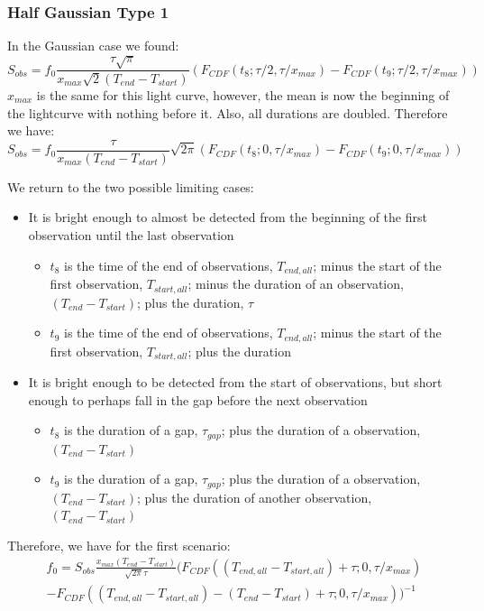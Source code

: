 \documentclass{article}
\begin{document}
\subsubsection{Half Gaussian Type 1}
In the Gaussian case we found:
\[S_{obs} = f_0  \frac{\tau\sqrt{\pi}}{x_{max}\sqrt{2}(T_{end}-T_{start})}(F_{CDF}(t_8; \tau/2,\tau/x_{max}) -F_{CDF}(t_9; \tau/2, \tau/x_{max}))\]
$x_{max}$ is the same for this light curve, however, the mean is now the beginning of the lightcurve with nothing before it. Also, all durations are doubled. Therefore we have:
\[S_{obs} = f_0 \frac{\tau}{x_{max}(T_{end} - T_{start})}\sqrt{2\pi}(F_{CDF}(t_8; 0,\tau/x_{max}) -F_{CDF}(t_9; 0, \tau/x_{max}))\]

We return to the two possible limiting cases:
\begin{itemize}
	\item It is bright enough to almost be detected from the beginning of the first observation until the last observation \begin{itemize}
		\item $t_8$ is the time of the end of observations, $T_{end, all}$; minus the start of the first observation, $T_{start, all}$; minus the duration of an observation, $(T_{end}-T_{start})$; plus the duration, $\tau$
		\item $t_9$ is the time of the end of observations,  $T_{end, all}$; minus the start of the first observation, $T_{start, all}$; plus the duration
	\end{itemize}
	\item It is bright enough to be detected from the start of observations, but short enough to perhaps fall in the gap before the next observation\begin{itemize}
		\item $t_8$ is the duration of a gap, $\tau_{gap}$; plus the duration of a observation, $(T_{end}-T_{start})$
		\item $t_9$ is the duration of a gap, $\tau_{gap}$; plus the duration of a observation, $(T_{end}-T_{start})$; plus the duration of another observation, $(T_{end}-T_{start})$
	\end{itemize} 
\end{itemize}
Therefore, we have for the first scenario:
\begin{equation}
\begin{split}
f_0  =  S_{obs}\frac{x_{max}(T_{end} - T_{start})}{\sqrt{2\pi}\tau} ( F_{CDF}((T_{end, all} - T_{start, all}) + \tau; 0, \tau/x_{max})\\-F_{CDF}((T_{end, all}-T_{start, all})-(T_{end}-T_{start})+ \tau; 0,\tau/x_{max}))^{-1}
\end{split}
\end{equation}
\end{document}
